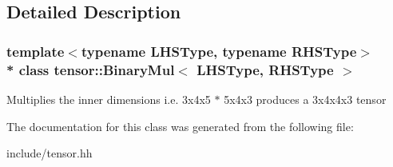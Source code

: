 \subsection{Detailed Description}
\subsubsection*{template$<$typename L\+H\+S\+Type, typename R\+H\+S\+Type$>$\\*
class tensor\+::\+Binary\+Mul$<$ L\+H\+S\+Type, R\+H\+S\+Type $>$}

Multiplies the inner dimensions i.\+e. 3x4x5 $\ast$ 5x4x3 produces a 3x4x4x3 tensor 

The documentation for this class was generated from the following file\+:\begin{DoxyCompactItemize}
\item 
include/tensor.\+hh\end{DoxyCompactItemize}
